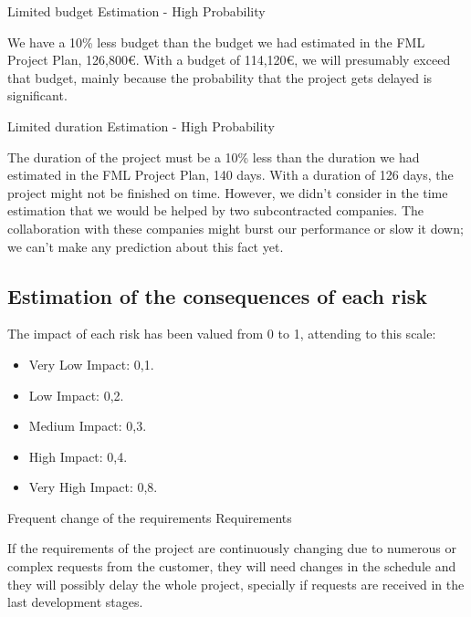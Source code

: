 \begin{risk}{Limited budget}
\riskcat Estimation
 - High Probability

We have a 10\% less budget than the budget we had estimated in the FML Project Plan,  126,800\euro. With a budget of 114,120\euro, we will presumably exceed that budget, mainly because the probability that the project gets delayed is significant.
\end{risk}

\begin{risk}{Limited duration}
\riskcat Estimation
 - High Probability

The duration of the project must be a 10\% less than the duration we had estimated in the FML Project Plan, 140 days. With a duration of 126 days, the project might not be finished on time. However, we didn't consider in the time estimation that we would be helped by two subcontracted companies. The collaboration with these companies might burst our performance or slow it down; we can't make any prediction about this fact yet.
\end{risk}



\subsection{Estimation of the consequences of each risk}

The impact of each risk has been valued from 0 to 1, attending to this scale:
\begin{itemize}
\item Very Low Impact: 0,1.
\item Low Impact: 0,2.
\item Medium Impact: 0,3.
\item High Impact: 0,4.
\item Very High Impact: 0,8.
\end{itemize}

\begin{risk}[riskReqChange]{Frequent change of the requirements}
\riskcat Requirements

If the requirements of the project are continuously changing due to numerous or complex requests from the customer, they will need changes in the schedule and they will possibly delay the whole project, specially if requests are received in the last development stages.
\end{risk}

